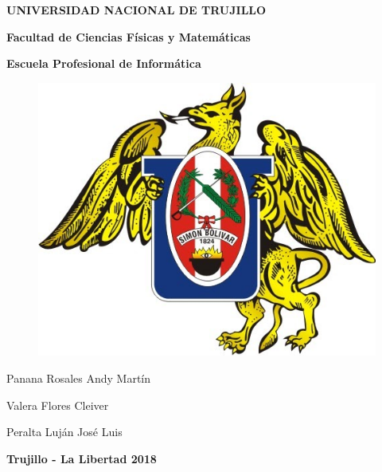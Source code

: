 \begin{center}
    {\bf {\fontsize{14}{16.8}\selectfont UNIVERSIDAD NACIONAL DE TRUJILLO}}     
    
    {\bf{\fontsize{14}{16.8}\selectfont Facultad de Ciencias Físicas y Matemáticas}} 

    {\bf{\fontsize{14}{16.8}\selectfont Escuela Profesional de Informática}}
\end{center}  
\begin{figure}[ht]
    \begin{center}
        \includegraphics[width=.3\textwidth]{unt}
    \end{center}
\end{figure}
    
\vskip 2cm

\begin{center}
    { \bf {\fontsize{17}{20.4}\selectfont{DISEÑO DE ALGORITMOS PARALELOS SOBRE LA ARQUITECTURA FOG COMPUTING PARA REDUCIR LA LATENCIA EN IoT}}  } 
\end{center}   

\vskip 1cm
{ \bf {\fontsize{17}{20.4}}  } 

\begin{center}
    {\fontsize{14}{16.8}\selectfont Panana Rosales Andy Martín}
    
    {\fontsize{14}{16.8}\selectfont Valera Flores Cleiver}
\end{center}

\vskip 1cm
{ \bf {\fontsize{17}{20.4}}  } 

\begin{center}
    {\fontsize{14}{16.8}\selectfont Peralta Luján José Luis}
\end{center}

\vskip 4cm

\begin{center}    
    {\bf {\fontsize{14}{16.8}\selectfont Trujillo - La Libertad
    \vskip 0.0cm
    \hspace*{-0.2cm} 
    \vskip 0.1cm
    2018 }}
\end{center} 
\newpage  
